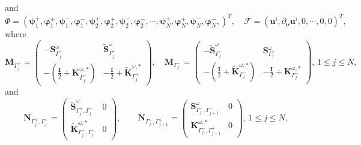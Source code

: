 \documentclass[10pt,reqno,oneside]{amsart}%
\theoremstyle{definition}
\theoremstyle{remark}
\numberwithin{equation}{section}
\numberwithin{equation}{section}
\begin{document}
and
$$
\Phi=\left(\boldsymbol{\psi}_{1}^+,\boldsymbol{\varphi}_{1}^+,\boldsymbol{\psi}_{1}^-,\boldsymbol{\varphi}_{1}^-,
\boldsymbol{\psi}_{2}^+,\boldsymbol{\varphi}_{2}^+,\boldsymbol{\psi}_{2}^-,\boldsymbol{\varphi}_{2}^-,
\cdots,\boldsymbol{\psi}_{N}^+,\boldsymbol{\varphi}_{N}^+,\boldsymbol{\psi}_{N}^-,\boldsymbol{\varphi}_{N}^-,\right)^T,\quad \mathcal{F}=\left(\mathbf{u}^{i},\partial_{\boldsymbol{\nu}} \mathbf{u}^{i},0,\cdots,0,0\right)^T,
$$
where
\begin{equation}
\mathbf{M}_{{\Gamma_j^+}}=
\begin{pmatrix}
-\mathbf{S}_{\Gamma_{j}^+}^{\omega} &\tilde{\mathbf{S}}_{\Gamma_{j}^+}^{\omega}  \\
-(\frac{\mathbf{I}}{2}+\mathbf{K}_{\Gamma_{j}^+}^{\omega,*}) &-\frac{\mathbf{I}}{2}+\tilde{\mathbf{K}}_{\Gamma_{j}^+}^{\omega,*}
\end{pmatrix},\quad
\mathbf{M}_{{\Gamma_j^-}}=
\begin{pmatrix}
-\tilde{\mathbf{S}}_{\Gamma_{j}^-}^{\omega} &{\mathbf{S}}_{\Gamma_{j}^-}^{\omega}  \\
-(\frac{\mathbf{I}}{2}+\tilde{\mathbf{K}}_{\Gamma_{j}^-}^{\omega,*}) &-\frac{\mathbf{I}}{2}+{\mathbf{K}}_{\Gamma_{j}^-}^{\omega,*}
\end{pmatrix},\,1\leq j\leq N,\nonumber
\end{equation}
and
\begin{equation}
\mathbf{N}_{{\Gamma_{j}^+},{\Gamma_{j}^-}}=
\begin{pmatrix}
\tilde{\mathbf{S}}_{\Gamma_{j}^+,\Gamma_{j}^-}^{\omega} &0 \\
\tilde{\mathbf{K}}_{\Gamma_{j}^+,\Gamma_{j}^-}^{\omega,*}&0
\end{pmatrix},\quad \quad
\mathbf{N}_{{\Gamma_{j}^-},{\Gamma_{j+1}^+}}=
\begin{pmatrix}
{\mathbf{S}}_{\Gamma_{j}^-,\Gamma_{j+1}^+}^{\omega} &0 \\
{\mathbf{K}}_{\Gamma_{j}^-,\Gamma_{j+1}^+}^{\omega,*}&0
\end{pmatrix},\,1\leq j\leq N,\nonumber
\end{equation}
\end{document}
